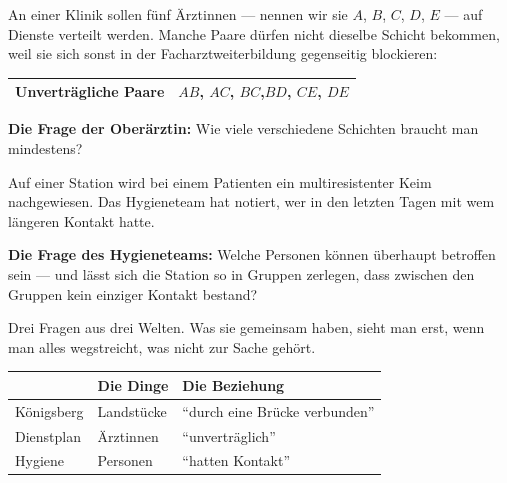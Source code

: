 \begin{merksatz}
An einer Klinik sollen fünf Ärztinnen --- nennen wir sie $A$, $B$, $C$, $D$, $E$ --- auf Dienste verteilt werden. Manche Paare dürfen nicht dieselbe Schicht bekommen, weil sie sich sonst in der Facharztweiterbildung gegenseitig blockieren:

\begin{center}
{\small
\renewcommand{\arraystretch}{1.42}
\begin{tabular}{@{}P{3.0cm}P{4.4cm}@{}}
\toprule
\textbf{Unverträgliche Paare} & $AB$, $AC$, $BC$,\newline $BD$, $CE$, $DE$\\
\bottomrule
\end{tabular}}
\end{center}

\textbf{Die Frage der Oberärztin:} Wie viele verschiedene Schichten braucht man mindestens?
\end{merksatz}

\begin{merksatz}
Auf einer Station wird bei einem Patienten ein multiresistenter Keim nachgewiesen. Das Hygieneteam hat notiert, wer in den letzten Tagen mit wem längeren Kontakt hatte.

\textbf{Die Frage des Hygieneteams:} Welche Personen können überhaupt betroffen sein --- und lässt sich die Station so in Gruppen zerlegen, dass zwischen den Gruppen kein einziger Kontakt bestand?
\end{merksatz}

Drei Fragen aus drei Welten. Was sie gemeinsam haben, sieht man erst, wenn man alles wegstreicht, was nicht zur Sache gehört.

\begin{merksatz}
\begin{center}
{\small
\renewcommand{\arraystretch}{1.5}
\begin{tabular}{@{}P{2.4cm}P{3.0cm}P{3.0cm}@{}}
\toprule
& \textbf{Die Dinge} & \textbf{Die Beziehung}\\
\midrule
Königsberg & Landstücke & \enquote{durch eine Brücke verbunden}\\
Dienstplan & Ärztinnen & \enquote{unverträglich}\\
Hygiene & Personen & \enquote{hatten Kontakt}\\
\bottomrule
\end{tabular}}
\end{center}

\begin{center}
\begin{minipage}{0.88\textwidth}
\end{minipage}
\end{center}
\end{merksatz}

